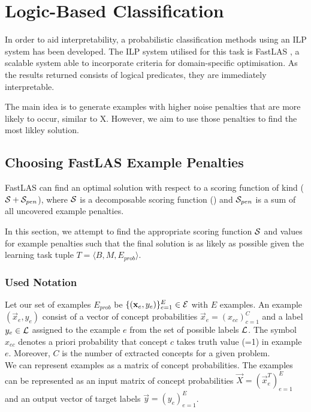 \chapter{Logic-Based Classification}

In order to aid interpretability, a probabilistic classification methods using an ILP system has been developed.
The ILP system utilised for this task is FastLAS \cite{RefWorks:RefID:19-law2020fastlas:}, a scalable system able to incorporate criteria for domain-specific optimisation.
As the results returned consists of logical predicates, they are immediately interpretable.

The main idea is to generate examples with higher noise penalties that are more likely to occur, similar to X.
However, we aim to use those penalties to find the most likley solution.


\section{Choosing FastLAS Example Penalties}

FastLAS can find an optimal solution with respect to a scoring function of kind ($\mathcal{S} + \mathcal{S}_{pen}$), where $\mathcal{S}$ is a decomposable scoring function () and $\mathcal{S}_{pen}$ is a sum of all uncovered example penalties.

In this section, we attempt to find the appropriate scoring function $\mathcal{S}$ and values for example penalties such that the final solution is as likely as possible given the learning task tuple $T = \langle B, M, E_{prob} \rangle$. 

\subsection{Used Notation}

Let our set of examples $E_{prob}$ be $\{(\textbf{x}_e, y_e)\}_{e=1}^{E} \in \mathcal{E}$ with $E$ examples. 
An example $(\vec{x}_e, y_e)$ consist of a vector of concept probabilities $\vec{x}_e = (x_{ec})_{c=1}^C$ and a label $y_e \in \mathcal{L}$ assigned to the example $e$ from the set of possible labels $\mathcal{L}$.
The symbol $x_{ec}$ denotes a priori probability that concept $c$ takes truth value (=1) in example $e$.
Moreover, $C$ is the number of extracted concepts for a given problem. \\
We can represent examples as a matrix of concept probabilities.  
The examples can be represented as an input matrix of concept probabilities $\vec{X} = (\vec{x}_e^T)_{e=1}^E$ and an output vector of target labels $\vec{y} = (y_e)_{e=1}^E$.

